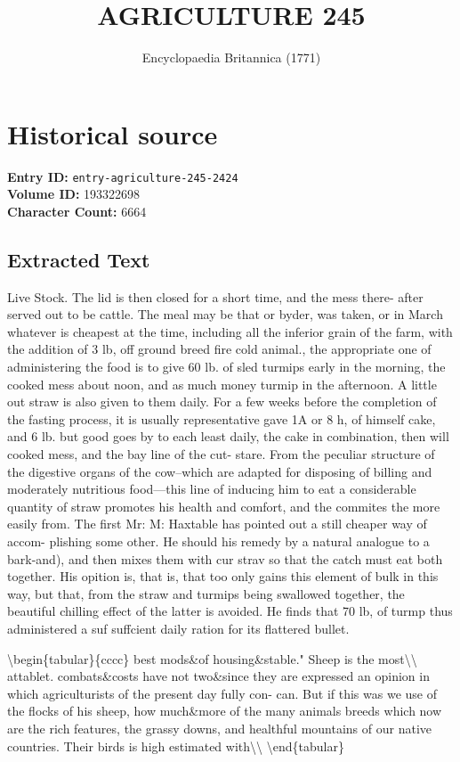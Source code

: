 \documentclass{article}
\title{AGRICULTURE 245}
\date{Encyclopaedia Britannica (1771)}
\begin{document}
\maketitle

\section*{Historical source}
\textbf{Entry ID:} \texttt{entry-agriculture-245-2424} \\
\textbf{Volume ID:} 193322698 \\
\textbf{Character Count:} 6664

\subsection*{Extracted Text}
Live Stock. The lid is then closed for a short time, and the mess there- after served out to be cattle. The meal may be that or byder, was taken, or in March whatever is cheapest at the time, including all the inferior grain of the farm, with the addition of 3 lb, off ground breed fire cold animal., the appropriate one of administering the food is to give 60 lb. of sled turmips early in the morning, the cooked mess about noon, and as much money turmip in the afternoon. A little out straw is also given to them daily. For a few weeks before the completion of the fasting process, it is usually representative gave 1A or 8 h, of himself cake, and 6 lb. but good goes by to each least daily, the cake in combination, then will cooked mess, and the bay line of the cut- stare. From the peculiar structure of the digestive organs of the cow--which are adapted for disposing of billing and moderately nutritious food—this line of inducing him to eat a considerable quantity of straw promotes his health and comfort, and the commites the more easily from. The first Mr: M: Haxtable has pointed out a still cheaper way of accom- plishing some other. He should his remedy by a natural analogue to a bark-and), and then mixes them with cur strav so that the catch must eat both together. His opition is, that is, that too only gains this element of bulk in this way, but that, from the straw and turmips being swallowed together, the beautiful chilling effect of the latter is avoided. He finds that 70 lb, of turmp thus administered a suf suffcient daily ration for its flattered bullet.

\textbackslash{}begin\{tabular\}\{cccc\}
best mods\&of housing\&stable." Sheep is the most\textbackslash{}\textbackslash{}
attablet. combats\&costs have not two\&since they are expressed an opinion in which agriculturists of the present day fully con- can. But if this was we use of the flocks of his sheep, how much\&more of the many animals breeds which now are the rich features, the grassy downs, and healthful mountains of our native countries. Their birds is high estimated with\textbackslash{}\textbackslash{}
\textbackslash{}end\{tabular\}
\end{document}
